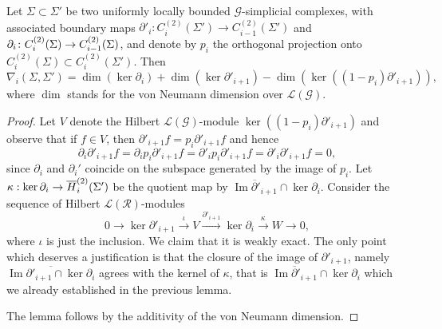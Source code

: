 \documentclass[AHL,Unicode,longabstracts,published]{cedram}
\newcommand{\RR}{\mathcal{R}}
\newcommand{\LL}{\mathcal{L}}
\newcommand{\cg}{\mathcal{G}}
\DeclareMathOperator{\Ima}{Im}
\begin{document}
\begin{lemm}\label{lem:formula_for_nabla}
Let $\Sigma \subset \Sigma'$ be two uniformly locally bounded $\cg$-simplicial complexes, with associated boundary maps $\partial'_i \colon C^{(2)}_i(\Sigma') \to C^{(2)}_{i-1}(\Sigma')$ and $\partial_i \colon C^{(2)}_i(\Sigma)\linebreak\to C^{(2)}_{i-1}(\Sigma)$, and denote by $p_i$ the orthogonal projection onto $C^{(2)}_i(\Sigma)\subset C^{(2)}_i(\Sigma')$. Then
\[
\nabla_i\left(\Sigma,\Sigma'\right) = \dim\left(\ker \partial_i\right) + \dim\left(\ker \partial'_{i+1}\right) - \dim\left(\ker\left(\left(1-p_i\right)\partial'_{i+1}\right)\right),
\]
where $\dim$ stands for the von Neumann dimension over $\LL(\cg)$.
\end{lemm}
\begin{proof}
Let $V$ denote the Hilbert $\LL(\cg)$-module $\ker((1-p_i)\partial'_{i+1})$ and observe that if $f\in V$, then $\partial'_{i+1}f=p_i\partial'_{i+1}f$ and hence
\[
\partial_i\partial'_{i+1}f=\partial_i p_i\partial'_{i+1}f=\partial'_ip_i\partial'_{i+1}f=\partial'_i\partial'_{i+1}f=0,
\]
since $\partial_i$ and $\partial_i'$ coincide on the subspace generated by the image of $p_i$. Let $\kappa:\ker \partial_i\linebreak\rightarrow \overline H_i^{(2)}(\Sigma')$ be the quotient map by $\overline{\Ima \partial'_{i+1}} \cap \ker \partial_i$. Consider the sequence of Hilbert $\LL(\RR)$-modules
\[
0 \to \ker \partial'_{i+1} \xrightarrow{\iota} V \xrightarrow{\partial'_{i+1}} \ker \partial_i \xrightarrow{\kappa} W \to 0,
\]
where $\iota$ is just the inclusion. We claim that it is weakly exact. The only point which deserves a justification is that the closure of the image of $\partial'_{i+1}$, namely $\overline{\Ima \partial'_{i+1} \cap \ker \partial_i}$ agrees with the kernel of $\kappa$, that is $\overline{\Ima \partial'_{i+1}} \cap \ker \partial_i$ which we already established in the previous lemma.

The lemma follows by the additivity of the von Neumann dimension.
\end{proof}
\end{document}
